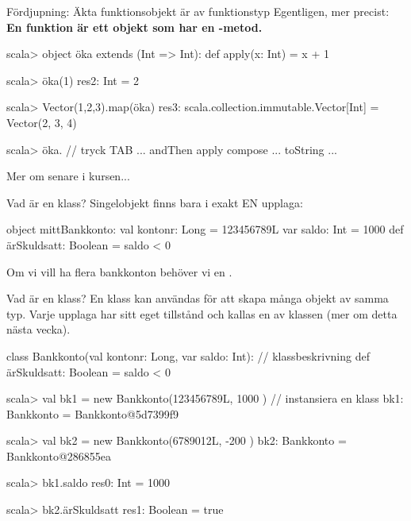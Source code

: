 \begin{Slide}{Fördjupning: Äkta funktionsobjekt är av funktionstyp}
Egentligen, mer precist:\\
\textbf{En funktion är ett objekt  som har en -metod.}
\pause
\begin{REPLnonum}
scala> object öka extends (Int => Int):
         def apply(x: Int) = x + 1
 
scala> öka(1)
res2: Int = 2

scala> Vector(1,2,3).map(öka)
res3: scala.collection.immutable.Vector[Int] = Vector(2, 3, 4)

scala> öka.   // tryck TAB
... andThen   apply   compose ... toString ...
\end{REPLnonum}
Mer om  senare i kursen... %
\end{Slide}




\begin{Slide}{Vad är en klass?}
Singelobjekt finns bara i exakt EN upplaga:
\begin{Code}
object mittBankkonto:
  val kontonr: Long        = 123456789L
  var saldo: Int           = 1000
  def ärSkuldsatt: Boolean = saldo < 0
\end{Code}
Om vi vill ha flera bankkonton behöver vi en  .
\end{Slide}

\begin{Slide}{Vad är en klass?}
En klass kan användas för att skapa många objekt av samma typ. Varje upplaga har sitt eget tillstånd och kallas en  av klassen (mer om detta nästa vecka).
\begin{Code}
class Bankkonto(val kontonr: Long, var saldo: Int): // klassbeskrivning
  def ärSkuldsatt: Boolean = saldo < 0
\end{Code}
\pause
\begin{REPL}
scala> val bk1 = new Bankkonto(123456789L, 1000 )   // instansiera en klass
bk1: Bankkonto = Bankkonto@5d7399f9

scala> val bk2 = new Bankkonto(6789012L, -200 )
bk2: Bankkonto = Bankkonto@286855ea

scala> bk1.saldo
res0: Int = 1000

scala> bk2.ärSkuldsatt
res1: Boolean = true
\end{REPL}
\end{Slide}

